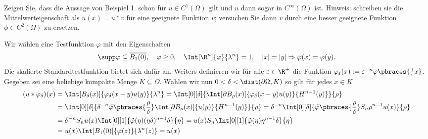 
\begin{exercise}

Zeigen Sie, dass die Aussage von Beispiel 1. schon für $u \in C^1(\Omega)$ gilt und $u$ dann sogar in $C^\infty(\Omega)$ ist.
Hinweis:
schreiben sie die Mittelwerteigenschaft als $u(x) = u \ast v$ für eine geeignete Funktion $v$;
versuchen Sie dann $v$ durch eine besser geeignete Funktion $\phi \in C^2(\Omega)$ zu ersetzen.

\end{exercise}


\begin{solution}

	Wir wählen eine Testfunktion $\varphi$ mit den Eigenschaften
	\begin{align*}
	\supp \varphi \subseteq \overline{B_1(0)}, \quad \varphi \geq 0, \quad \Int[\R^n]{\varphi}{\lambda^n} = 1, \quad |x| = |y| \Rightarrow \varphi(x) = \varphi(y).
	\end{align*}
	Die skalierte Standardtestfunktion bietet sich dafür an. Weiters definieren wir für alle $\varepsilon \in \R^+$ die Funktion $\varphi_\varepsilon (x) := \varepsilon^{-n} \varphi\pbraces{\frac{1}{\varepsilon}x}$. Gegeben sei eine beliebige kompakte Menge $K \subseteq \Omega$. Wählen wir nun $0 < \delta < \dist(\partial \Omega, K)$ so gilt für jedes $x \in K$ 
	\begin{align*}
	(u \ast \varphi_\delta)(x) &= \Int[B_\delta(x)]{\varphi_\delta(x - y) u(y) }{\lambda^n} = \Int[0][\delta]{\Int[\partial B_\rho(x)]{\varphi_\delta(x - y) u(y) }{H^{n-1}(y)}}{\rho} \\
	 &= \Int[0][\delta]{\delta^{-n} \tilde{\varphi}\pbraces{\frac{\rho}{\delta}}\Int[\partial B_\rho(x)]{ u(y) }{H^{n-1}(y)}}{\rho} = \delta^{-n} \Int[0][\delta]{\tilde{\varphi}\pbraces{\frac{\rho}{\delta}}S_n \rho^{n-1} u(x)}{\rho} \\
	 &= \delta^{-n} S_n u(x) \Int[0][1]{\tilde{\varphi}(\eta) (\eta \delta)^{n-1} \delta }{\eta} = u(x) S_n  \Int[0][1]{\tilde{\varphi}(\eta) \eta^{n-1} \delta }{\eta} \\
	 &= u(x) \Int[B_1(0)]{\varphi(z)}{\lambda^n(z)} = u(x)
	\end{align*}
\end{solution}

